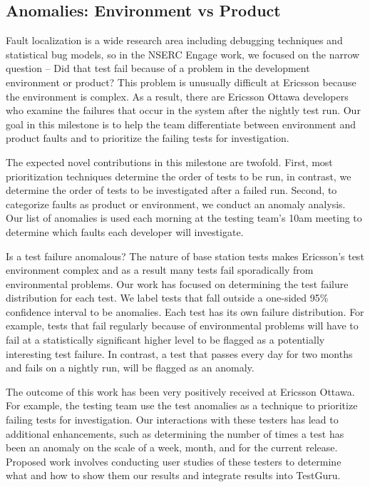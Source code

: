 \subsection{Anomalies: Environment vs Product}

Fault localization is a wide research area including debugging techniques and statistical bug models, so in the NSERC Engage work, we focused on the narrow question -- Did that test fail because of a problem in the development environment or product? This problem is unusually difficult at Ericsson because the environment is complex. As a result, there are  Ericsson Ottawa developers who examine the failures that occur in the system after the nightly test run. Our goal in this milestone is to help the team differentiate between environment and product faults and to prioritize the failing tests for investigation.

The expected novel contributions in this milestone are twofold. First, most prioritization techniques determine the order of tests to be run, in contrast, we determine the order of tests to be investigated after a failed run. Second, to categorize faults as product or environment, we conduct an anomaly analysis. Our list of anomalies is used each morning at the testing team's 10am meeting to determine which faults each developer will investigate. 

Is a test failure anomalous? The nature of base station tests makes Ericsson's test environment complex and as a result many tests fail sporadically from environmental problems. Our work has focused on determining the test failure distribution for each test. We label tests that fall outside a one-sided 95\% confidence interval to be anomalies. Each test has its own failure distribution. For example, tests that fail regularly because of environmental problems will have to fail at a statistically significant higher level to be flagged as a potentially interesting test failure. In contrast, a test that passes every day for two months and fails on a nightly run, will be flagged as an anomaly. 

The outcome of this work has been very positively received at Ericsson Ottawa. For example, the testing team use the test anomalies as a technique to prioritize failing tests for investigation. Our interactions with these testers has lead to additional enhancements, such as determining the number of times a test has been an anomaly on the scale of a week, month, and for the current release. Proposed work involves conducting user studies of these testers to determine what and how to show them our results and integrate results into TestGuru. 

